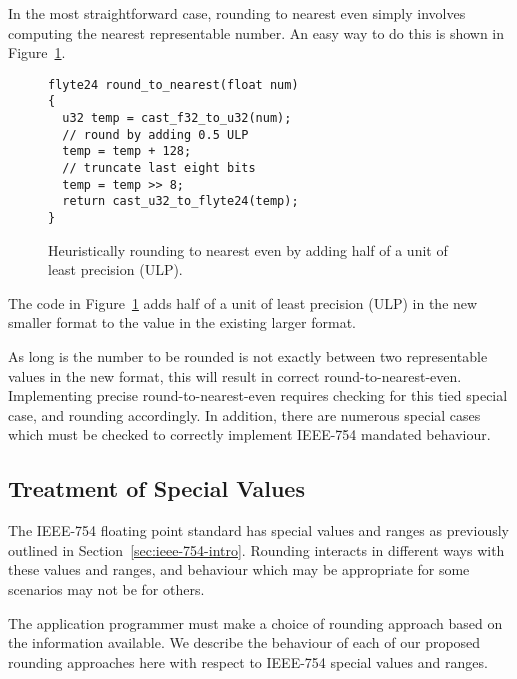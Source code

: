 \documentclass{sig-alternate-05-2015}
\begin{document}
\noindent In the most straightforward case, rounding to nearest even simply
involves computing the nearest representable number. An easy way to do this is
shown in Figure~\ref{fig:rounding-to-nearest}.

\begin{figure}[h]
\centering
\begin{verbatim}
flyte24 round_to_nearest(float num)
{
  u32 temp = cast_f32_to_u32(num);
  // round by adding 0.5 ULP
  temp = temp + 128;
  // truncate last eight bits
  temp = temp >> 8;
  return cast_u32_to_flyte24(temp);
}
\end{verbatim}
\caption{Heuristically rounding to nearest even by adding half of a unit of least precision (ULP).}
\label{fig:rounding-to-nearest}
\end{figure}

\noindent The code in Figure~\ref{fig:rounding-to-nearest} adds half of a unit
of least precision (ULP) in the new smaller format to the value in the existing
larger format.

As long is the number to be rounded is not exactly between two representable
values in the new format, this will result in correct round-to-nearest-even.
Implementing precise round-to-nearest-even requires checking for this tied
special case, and rounding accordingly. In addition, there are numerous special
cases which must be checked to correctly implement IEEE-754 mandated behaviour.

















\subsection{Treatment of Special Values}

The IEEE-754 floating point standard has special values and ranges as
previously outlined in Section~\ref{sec:ieee-754-intro}. Rounding interacts in
different ways with these values and ranges, and behaviour which may be
appropriate for some scenarios may not be for others.

The application programmer must make a choice of rounding approach based on the
information available. We describe the behaviour of each of our proposed
rounding approaches here with respect to IEEE-754 special values and ranges.
\end{document}
